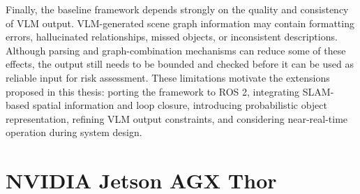 {Finally, the baseline framework depends strongly on the quality and consistency of VLM output. VLM-generated scene graph information may contain formatting errors, hallucinated relationships, missed objects, or inconsistent descriptions. Although parsing and graph-combination mechanisms can reduce some of these effects, the output still needs to be bounded and checked before it can be used as reliable input for risk assessment. These limitations motivate the extensions proposed in this thesis: porting the framework to ROS 2, integrating SLAM-based spatial information and loop closure, introducing probabilistic object representation, refining VLM output constraints, and considering near-real-time operation during system design.

}








\section{NVIDIA Jetson AGX Thor}

